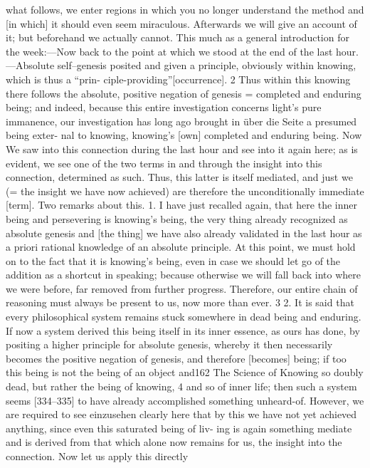 what follows, we enter regions in which you no longer understand the method
and [in which] it should even seem miraculous. Afterwards we will give an
account of it; but beforehand we actually cannot.
This much as a general introduction for the week:—Now back to the
point at which we stood at the end of the last hour.—Absolute self–genesis
posited and given a principle, obviously within knowing, which is thus a “prin-
ciple-providing”[occurrence]. 2 Thus within this knowing there follows the
absolute, positive negation of genesis = completed and enduring being; and
indeed, because this entire investigation concerns light’s pure immanence, our
investigation has long ago brought in {über die Seite} a presumed being exter-
nal to knowing, knowing’s [own] completed and enduring being.
Now We saw into this connection during the last hour and see into it
again here; as is evident, we see one of the two terms in and through the
insight into this connection, determined as such. Thus, this latter is itself
mediated, and just we (= the insight we have now achieved) are therefore the
unconditionally immediate [term].
Two remarks about this. 1. I have just recalled again, that here the inner
being and persevering is knowing’s being, the very thing already recognized as
absolute genesis and [the thing] we have also already validated in the last hour
as a priori rational knowledge of an absolute principle. At this point, we must
hold on to the fact that it is knowing’s being, even in case we should let go of
the addition as a shortcut in speaking; because otherwise we will fall back into
where we were before, far removed from further progress. Therefore, our
entire chain of reasoning must always be present to us, now more than ever. 3
2. It is said that every philosophical system remains stuck somewhere in dead
being and enduring. If now a system derived this being itself in its inner
essence, as ours has done, by positing a higher principle for absolute genesis,
whereby it then necessarily becomes the positive negation of genesis, and
therefore [becomes] being; if too this being is not the being of an object and162
The Science of Knowing
so doubly dead, but rather the being of knowing, 4 and so of inner life; then
such a system seems [334–335] to have already accomplished something
unheard-of. However, we are required to see {einzusehen} clearly here that by
this we have not yet achieved anything, since even this saturated being of liv-
ing is again something mediate and is derived from that which alone now
remains for us, the insight into the connection. Now let us apply this directly
